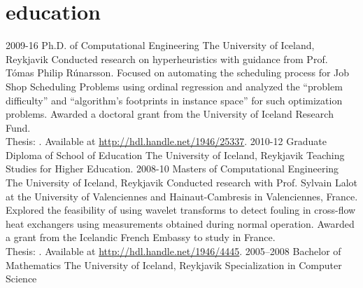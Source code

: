 \section{education}
\begin{entrylist}
\entry
{2009-16}
{Ph.D. {\normalfont of Computational Engineering}}
{The University of Iceland, Reykjavik}
{Conducted research on hyperheuristics with guidance from Prof. Tómas Philip Rúnarsson. Focused on automating the scheduling process for Job Shop Scheduling Problems using ordinal regression and analyzed the ``problem difficulty'' and ``algorithm's footprints in instance space'' for such optimization problems. Awarded a doctoral grant from the University of Iceland Research Fund. \\
{\boldfont Thesis:} . 
Available at \url{http://hdl.handle.net/1946/25337}.}
\entry
{2010-12}
{Graduate Diploma {\normalfont of School of Education}}
{The University of Iceland, Reykjavik}
{Teaching Studies for Higher Education.}
\entry
{2008-10}
{Masters {\normalfont of Computational Engineering}}
{The University of Iceland, Reykjavik}
{Conducted research with Prof. Sylvain Lalot at the University of Valenciennes and Hainaut-Cambresis in Valenciennes, France. Explored the feasibility of using wavelet transforms to detect fouling in cross-flow heat exchangers using measurements obtained during normal operation.
Awarded a grant from the Icelandic French Embassy to study in France. \\	
{\boldfont Thesis:} . 
Available at \url{http://hdl.handle.net/1946/4445}.}
\entry
{2005--2008}
{Bachelor {\normalfont of Mathematics}}
{The University of Iceland, Reykjavik}
{Specialization in Computer Science}
\end{entrylist}
